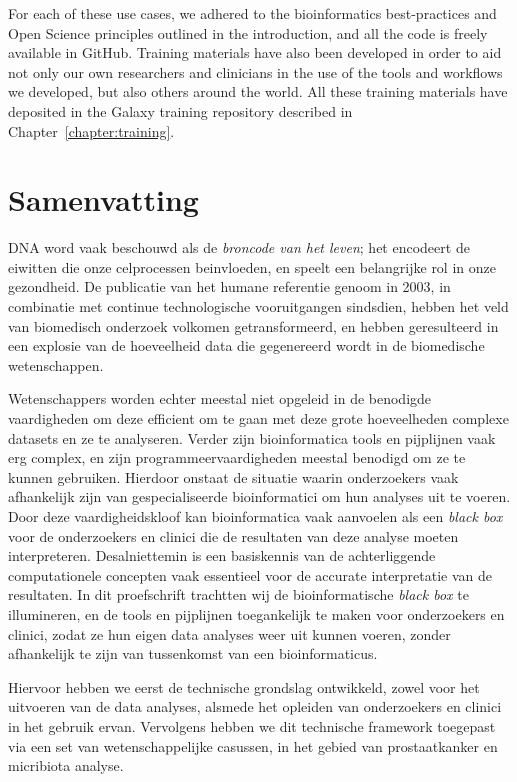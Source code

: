 For each of these use cases, we adhered to the bioinformatics best-practices and Open Science principles outlined in the introduction, and all the code is freely available in GitHub. Training materials have also been developed in order to aid not only our own researchers and clinicians in the use of the tools and workflows we developed, but also others around the world. All these training materials have deposited in the Galaxy training repository described in Chapter~\ref{chapter:training}.


\section{Samenvatting}

DNA word vaak beschouwd als de \emph{broncode van het leven}; het encodeert
de eiwitten die onze celprocessen beinvloeden, en speelt een belangrijke rol in onze gezondheid.
De publicatie van het humane referentie genoom in 2003, in combinatie met continue technologische vooruitgangen sindsdien, hebben het veld van biomedisch onderzoek volkomen getransformeerd, en hebben geresulteerd in een explosie van de hoeveelheid data die gegenereerd wordt in de biomedische wetenschappen.

Wetenschappers worden echter meestal niet opgeleid in de benodigde vaardigheden om deze efficient om te gaan met deze grote hoeveelheden complexe datasets en ze te analyseren.
Verder zijn bioinformatica tools en pijplijnen vaak erg complex, en zijn programmeervaardigheden meestal benodigd om ze te kunnen gebruiken. Hierdoor onstaat de situatie waarin onderzoekers vaak afhankelijk zijn van gespecialiseerde bioinformatici om hun analyses uit te voeren.
Door deze vaardigheidskloof kan bioinformatica vaak aanvoelen als een \emph{black box} voor de onderzoekers en clinici die de resultaten van deze analyse moeten interpreteren.
Desalniettemin is een basiskennis van de achterliggende computationele concepten vaak essentieel voor de accurate interpretatie van de resultaten.
In dit proefschrift trachtten wij de bioinformatische \emph{black box} te illumineren, en de tools en pijplijnen toegankelijk te maken voor onderzoekers en clinici, zodat ze hun eigen data analyses weer uit kunnen voeren, zonder afhankelijk te zijn van tussenkomst van een bioinformaticus.

Hiervoor hebben we eerst de technische grondslag ontwikkeld, zowel voor het uitvoeren van de data analyses, alsmede het opleiden van onderzoekers en clinici in het gebruik ervan. Vervolgens hebben we dit technische framework toegepast via een set van wetenschappelijke casussen, in het gebied van prostaatkanker en micribiota analyse.

